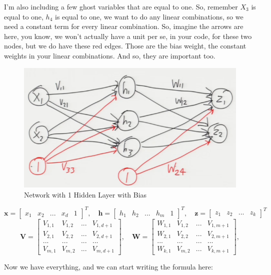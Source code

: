 \documentclass[fleqn,10pt]{olplainarticle}
\theoremstyle{definition}
\theoremstyle{remark}
\begin{document}
I'm also including a few ghost variables that are equal to one. So, remember $X_3$ is equal to one, $h_4$ is equal to one, we want to do any linear combinations, so we need a constant term for every linear combination. So, imagine the arrows are here, you know, we won't actually have a unit per se, in your code, for these two nodes, but we do have these red edges. Those are the bias weight, the constant weights in your linear combinations. And so, they are important too. 
\begin{figure}[ht]
\centering
\includegraphics[width=0.7\linewidth]{images/nn_1_layer_diagram_w_bias}
\caption{Network with 1 Hidden Layer with Bias}
\label{fig:nn_1_layer_diagram_w_bias}
\end{figure}
$$\mathbf{x} = 
\begin{bmatrix}
x_1 & x_2 & ... & x_d & 1
\end{bmatrix}^T,\quad
\mathbf{h} = 
\begin{bmatrix}
h_1 & h_2 & ... & h_m & 1
\end{bmatrix}^T,\quad
\mathbf{z} = 
\begin{bmatrix}
z_1 & z_2 & ... & z_k
\end{bmatrix}^T
$$
$$
\mathbf{V} = 
\begin{bmatrix} 
V_{1,1} & V_{1,2} & ... & V_{1, d+1} \\ 
V_{2,1} & V_{2,2} & ... & V_{2,d+1} \\ 
... & ... & ... & ... \\
V_{m,1} & V_{m,2} & ... & V_{m,d+1} 
\end{bmatrix},\quad
\mathbf{W} = 
\begin{bmatrix} 
W_{1,1} & V_{1,2} & ... & V_{1, m+1} \\ 
W_{2,1} & V_{2,2} & ... & V_{2,m+1} \\ 
... & ... & ... & ... \\
W_{k,1} & V_{m,2} & ... & V_{k,m+1} 
\end{bmatrix},
$$

Now we have everything, and we can start writing the formula here:
\end{document}
